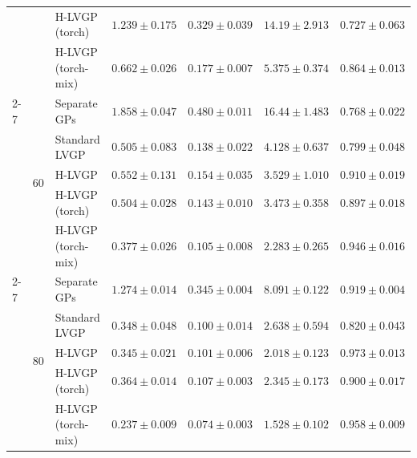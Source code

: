 \begin{table}[htbp]
\begin{tabular}{lllrrrr}
 &  & H-LVGP (torch) & $1.239 \pm 0.175$ & $0.329 \pm 0.039$ & $14.19 \pm 2.913$ & $0.727 \pm 0.063$ \\
 &  & H-LVGP (torch-mix) & \colorbox{green!20}{\boldmath$0.662 \pm 0.026$} & \colorbox{green!20}{\boldmath$0.177 \pm 0.007$} & \colorbox{green!20}{\boldmath$5.375 \pm 0.374$} & \colorbox{green!20}{\boldmath$0.864 \pm 0.013$} \\
\cmidrule(lr){2-7}
 & \multirow{5}{*}{60} & Separate GPs & $1.858 \pm 0.047$ & $0.480 \pm 0.011$ & $16.44 \pm 1.483$ & $0.768 \pm 0.022$ \\
 &  & Standard LVGP & $0.505 \pm 0.083$ & $0.138 \pm 0.022$ & $4.128 \pm 0.637$ & $0.799 \pm 0.048$ \\
 &  & H-LVGP & $0.552 \pm 0.131$ & $0.154 \pm 0.035$ & $3.529 \pm 1.010$ & $0.910 \pm 0.019$ \\
 &  & H-LVGP (torch) & $0.504 \pm 0.028$ & $0.143 \pm 0.010$ & $3.473 \pm 0.358$ & $0.897 \pm 0.018$ \\
 &  & H-LVGP (torch-mix) & \colorbox{green!20}{\boldmath$0.377 \pm 0.026$} & \colorbox{green!20}{\boldmath$0.105 \pm 0.008$} & \colorbox{green!20}{\boldmath$2.283 \pm 0.265$} & \colorbox{green!20}{\boldmath$0.946 \pm 0.016$} \\
\cmidrule(lr){2-7}
 & \multirow{5}{*}{80} & Separate GPs & $1.274 \pm 0.014$ & $0.345 \pm 0.004$ & $8.091 \pm 0.122$ & $0.919 \pm 0.004$ \\
 &  & Standard LVGP & $0.348 \pm 0.048$ & $0.100 \pm 0.014$ & $2.638 \pm 0.594$ & $0.820 \pm 0.043$ \\
 &  & H-LVGP & $0.345 \pm 0.021$ & $0.101 \pm 0.006$ & $2.018 \pm 0.123$ & $0.973 \pm 0.013$ \\
 &  & H-LVGP (torch) & $0.364 \pm 0.014$ & $0.107 \pm 0.003$ & $2.345 \pm 0.173$ & $0.900 \pm 0.017$ \\
 &  & H-LVGP (torch-mix) & \colorbox{green!20}{\boldmath$0.237 \pm 0.009$} & \colorbox{green!20}{\boldmath$0.074 \pm 0.003$} & \colorbox{green!20}{\boldmath$1.528 \pm 0.102$} & \colorbox{green!20}{\boldmath$0.958 \pm 0.009$} \\
\bottomrule
\end{tabular}
\end{table}
